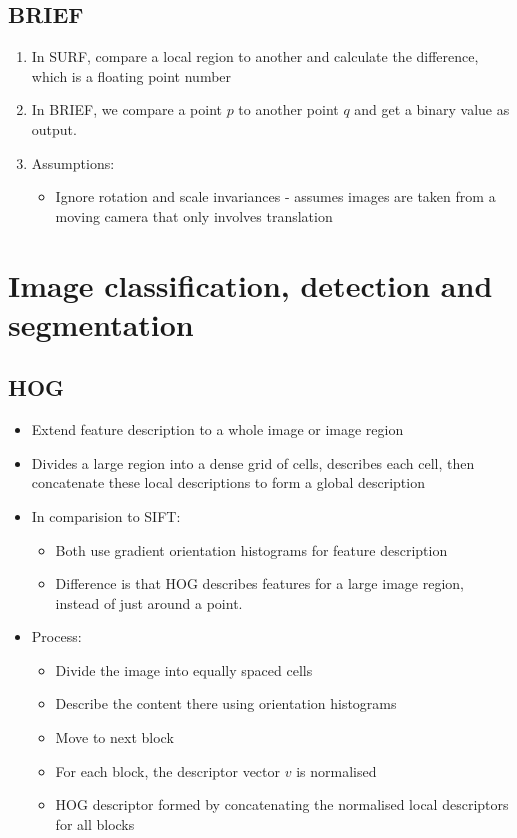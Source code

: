 \documentclass[9pt]{article}
\begin{document}
\begin{multicols*}{2}
        \subsection{BRIEF}
        \begin{enumerate}
            \item In SURF, compare a local region to another and calculate the difference, which is a floating point number
            \item In BRIEF, we compare a point $p$ to another point $q$ and get a binary value as output.
            \item Assumptions:
            \begin{itemize}
                \item Ignore rotation and scale invariances - assumes images are taken from a moving camera that only involves translation
            \end{itemize}
        \end{enumerate}

    \section{Image classification, detection and segmentation}
    \subsection{HOG}
    \begin{itemize}
        \item Extend feature description to a whole image or image region 
        \item Divides a large region into a dense grid of cells, describes each cell, then concatenate these local descriptions to form a 
        global description
        \item In comparision to SIFT:
        \begin{itemize}
            \item Both use gradient orientation histograms for feature description
            \item Difference is that HOG describes features for a large image region, instead of just around a point.
        \end{itemize}
        \item Process:
        \begin{itemize}
            \item Divide the image into equally spaced cells
            \item Describe the content there using orientation histograms
            \item Move to next block
            \item For each block, the descriptor vector $v$ is normalised 
            \item HOG descriptor formed by concatenating the normalised local descriptors for all blocks 
        \end{itemize}
    \end{itemize}


\end{multicols*}
\end{document}
